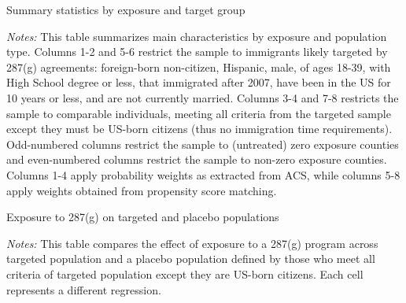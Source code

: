 \documentclass{article}
\begin{document}
\newpage
\begin{landscape}
\begin{table}[h]
\centering
\caption{Summary statistics by exposure and target group}
\label{tab:sumstat}
\end{table}

\justifying
\begin{spacing}{1}
\begin{footnotesize}
\noindent \textit{Notes:} This table summarizes main characteristics by exposure and population type. Columns 1-2 and 5-6 restrict the sample to immigrants likely targeted by 287(g) agreements: foreign-born non-citizen, Hispanic, male, of ages 18-39, with High School degree or less, that immigrated after 2007, have been in the US for 10 years or less, and are not currently married. Columns 3-4 and 7-8 restricts the sample to comparable individuals, meeting all criteria from the targeted sample except they must be US-born citizens (thus no immigration time requirements). Odd-numbered columns restrict the sample to (untreated) zero exposure counties and even-numbered columns restrict the sample to non-zero exposure counties. Columns 1-4 apply probability weights as extracted from ACS, while columns 5-8 apply weights obtained from propensity score matching.
\end{footnotesize}
\end{spacing}
\end{landscape}




\newpage
\begin{table}[h]
\centering
\caption{Exposure to 287(g)  on targeted and placebo populations}
\label{tab:sumstat}
\end{table}

\justifying
\begin{spacing}{1}
\begin{footnotesize}
\noindent \textit{Notes:} This table compares the effect of exposure to a 287(g) program across targeted population and a placebo population defined by those who meet all criteria of targeted population except they are US-born citizens. Each cell represents a different regression. 
\end{footnotesize}
\end{spacing}
\end{document}
